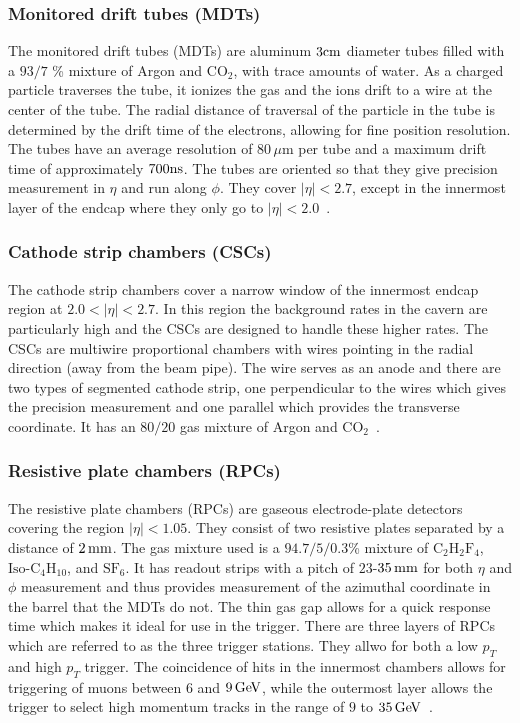 \subsubsection{Monitored drift tubes (MDTs)}

The monitored drift tubes (MDTs) are aluminum $3 \rm cm$ diameter tubes filled with a $93/7$ \% mixture of Argon and $\textrm{CO}_2$, with trace amounts of water. As a charged particle traverses the tube, it ionizes the gas and the ions drift to a wire at the center of the tube. The radial distance of traversal of the particle in the tube is determined by the drift time of the electrons, allowing for fine position resolution. The tubes have an average resolution of $80\,\mu\textrm{m}$ per tube and a maximum drift time of approximately $700 \rm ns$. The tubes are oriented so that they give precision measurement in $\eta$ and run along $\phi$. They cover $|\eta| < 2.7$, except in the innermost layer of the endcap where they only go to $|\eta| < 2.0$~\cite{ATLASPaper}.

\subsubsection{Cathode strip chambers (CSCs)}

The cathode strip chambers cover a narrow window of the innermost endcap region at $2.0 < |\eta|< 2.7$. In this region the background rates in the cavern are particularly high and the CSCs are designed to handle these higher rates. The CSCs are multiwire proportional chambers with wires pointing in the radial direction (away from the beam pipe). The wire serves as an anode and there are two types of segmented cathode strip, one perpendicular to the wires which gives the precision measurement and one parallel which provides the transverse coordinate. It has an $80/20$ gas mixture of Argon and $\textrm{CO}_2$~\cite{ATLASPaper}. 

\subsubsection{Resistive plate chambers (RPCs)}

The resistive plate chambers (RPCs) are gaseous electrode-plate detectors covering the region $|\eta| < 1.05$. They consist of two resistive plates separated by a distance of $2\,\rm mm$. The gas mixture used is a $94.7/5/0.3$\% mixture of $\textrm{C}_2\textrm{H}_2\textrm{F}_4$, $\textrm{Iso-C}_4\textrm{H}_10$, and $\textrm{SF}_6$. It has readout strips with a pitch of $23$-$35\, \rm mm$ for both $\eta$ and $\phi$ measurement and thus provides measurement of the azimuthal coordinate in the barrel that the MDTs do not. The thin gas gap allows for a quick response time which makes it ideal for use in the trigger. There are three layers of RPCs which are referred to as the three trigger stations. They allwo for both a low $p_{T}$ and high $p_{T}$ trigger. The coincidence of hits in the innermost chambers allows for triggering of muons between $6$ and $9 \GeV$, while the outermost layer allows the trigger to select high momentum tracks in the range of $9$ to $35\GeV$~\cite{ATLASPaper}.


